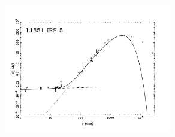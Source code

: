 \documentclass[9pt]{extarticle}   	%
\begin{document}
\clearpage
\begin{figure}[htbp]
\begin{center}
\includegraphics[width=0.65\textwidth]{plots/L1551.pdf}
\label{default}
\end{center}
\end{figure}

\clearpage
\end{document}
